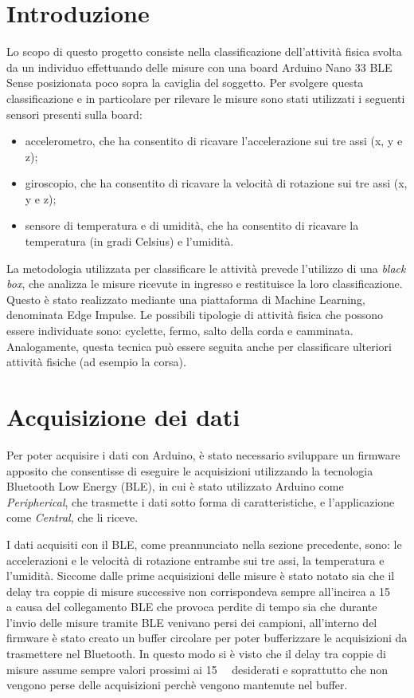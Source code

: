 \section{Introduzione}
Lo scopo di questo progetto consiste nella classificazione dell'attività fisica svolta da un individuo effettuando delle misure con una board Arduino Nano 33 BLE Sense posizionata poco sopra la caviglia del soggetto. Per svolgere questa classificazione e in particolare per rilevare le misure sono stati utilizzati i seguenti sensori presenti sulla board:
\begin{itemize}
	\item accelerometro, che ha consentito di ricavare l'accelerazione sui tre assi (x, y e z);
	\item giroscopio, che ha consentito di ricavare la velocità di rotazione sui tre assi (x, y e z);
	\item sensore di temperatura e di umidità, che ha consentito di ricavare la temperatura (in gradi Celsius) e l'umidità.
\end{itemize}
La metodologia utilizzata per classificare le attività prevede l'utilizzo di una \textit{black box}, che analizza le misure ricevute in ingresso e restituisce la loro classificazione. Questo è stato realizzato mediante una piattaforma di Machine Learning, denominata Edge Impulse. Le possibili tipologie di attività fisica che possono essere individuate sono: cyclette, fermo, salto della corda e camminata. Analogamente, questa tecnica può essere seguita anche per classificare ulteriori attività fisiche (ad esempio la corsa).

\section{Acquisizione dei dati}
Per poter acquisire i dati con Arduino, è stato necessario sviluppare un firmware apposito che consentisse di eseguire le acquisizioni utilizzando la tecnologia Bluetooth Low Energy (BLE), in cui è stato utilizzato Arduino come \textit{Peripherical}, che trasmette i dati sotto forma di caratteristiche, e l'applicazione come \textit{Central}, che li riceve. 

I dati acquisiti con il BLE, come preannunciato nella sezione precedente, sono: le accelerazioni e le velocità di rotazione entrambe sui tre assi, la temperatura e l'umidità.
Siccome dalle prime acquisizioni delle misure è stato notato sia che il delay tra coppie di misure successive non corrispondeva sempre all'incirca a \SI{15}{\milli\seconds} a causa del collegamento BLE che provoca perdite di tempo sia che durante l'invio delle misure tramite BLE venivano persi dei campioni, all'interno del firmware è stato creato un buffer circolare per poter bufferizzare le acquisizioni da trasmettere nel Bluetooth. In questo modo si è visto che il delay tra coppie di misure assume sempre valori prossimi ai \SI{15}{\milli\seconds} desiderati e soprattutto che non vengono perse delle acquisizioni perchè vengono mantenute nel buffer.

